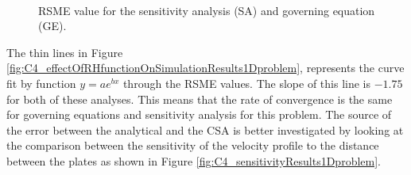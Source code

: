 \begin{figure}[H]
    \centering
    \\
    \caption{RSME value for the sensitivity analysis (SA) and governing equation (GE).}
    \label{fig:C4_effectOfNumberOfNodesOnSensitivityResults1Dproblem}
\end{figure}

The thin lines in Figure \ref{fig:C4_effectOfRHfunctionOnSimulationResults1Dproblem}, represents the curve fit by function $y = ae^{bx}$ through the RSME values. The slope of this line is $-1.75$ for both of these analyses. This means that the rate of convergence is the same for governing equations and sensitivity analysis for this problem. The source of the error between the analytical and the CSA is better investigated by looking at the comparison between the sensitivity of the velocity profile to the distance between the plates as shown in Figure \ref{fig:C4_sensitivityResults1Dproblem}.


